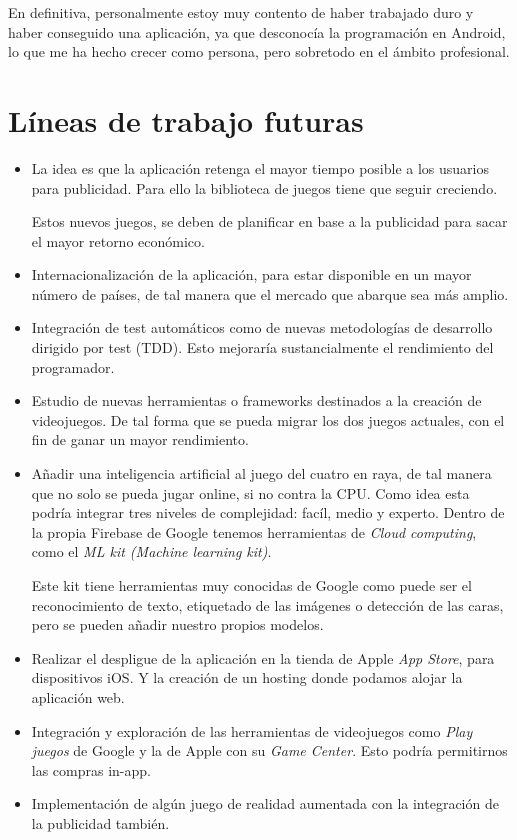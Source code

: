 En definitiva, personalmente estoy muy contento de haber trabajado duro y haber conseguido una aplicación, ya que desconocía la programación en Android, lo que me ha hecho crecer como persona, pero sobretodo en el ámbito profesional.


\section{Líneas de trabajo futuras}


\begin{itemize}
\item La idea es que la aplicación retenga el mayor tiempo posible a los usuarios para publicidad. Para ello la biblioteca de juegos tiene que seguir creciendo. 

Estos nuevos juegos, se deben de planificar en base a la publicidad para sacar el mayor retorno económico.

\item Internacionalización de la aplicación, para estar disponible en un mayor número de países, de tal manera que el mercado que abarque sea más amplio.

\item Integración de test automáticos como de nuevas metodologías de desarrollo dirigido por test (TDD). Esto mejoraría sustancialmente el rendimiento del programador.

\item Estudio de nuevas herramientas o frameworks destinados a la creación de videojuegos. De tal forma que se pueda migrar los dos juegos actuales, con el fin de ganar un mayor rendimiento.

\item Añadir una inteligencia artificial al juego del cuatro en raya, de tal manera que no solo se pueda jugar online, si no contra la CPU. Como idea esta podría integrar tres niveles de complejidad: facíl, medio y experto. Dentro de la propia Firebase de Google tenemos herramientas de \emph{Cloud computing}, como el \emph{ML kit (Machine learning kit)}. 

Este kit tiene herramientas muy conocidas de Google como puede ser el reconocimiento de texto, etiquetado de las imágenes o detección de las caras, pero se pueden añadir nuestro propios modelos.

\item Realizar el despligue de la aplicación en la tienda de Apple \emph{App Store}, para dispositivos iOS. Y la creación de un hosting donde podamos alojar la aplicación web.
	
\item Integración y exploración de las herramientas de videojuegos como \emph{Play juegos} de Google y la de Apple con su \emph{Game Center}. Esto podría permitirnos las compras in-app.

\item Implementación de algún juego de realidad aumentada con la integración de la publicidad también.
\end{itemize}